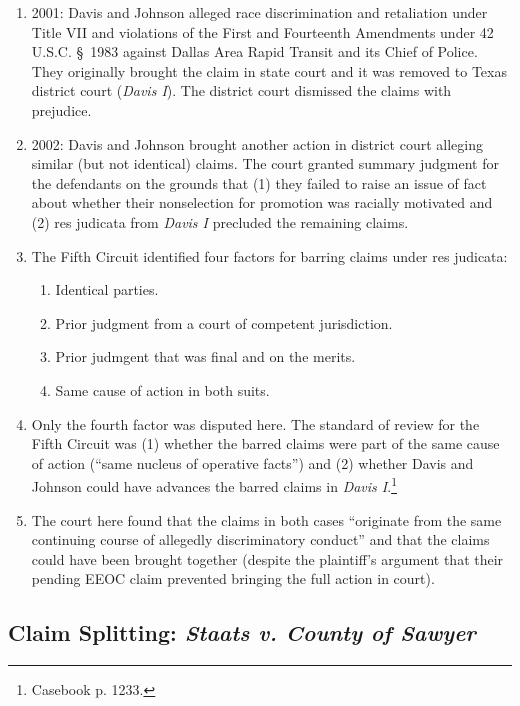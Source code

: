 \begin{enumerate}
    \item 2001: Davis and Johnson alleged race discrimination and retaliation 
    under Title VII and violations of the First and Fourteenth Amendments 
    under 42 U.S.C. \S\ 1983 against Dallas Area Rapid Transit and its Chief 
    of Police. They originally brought the claim in state court and it was 
    removed to Texas district court (\emph{Davis I}). The district court 
    dismissed the claims with prejudice.
    \item 2002: Davis and Johnson brought another action in district court 
    alleging similar (but not identical) claims. The court granted summary 
    judgment for the defendants on the grounds that (1) they failed to raise 
    an issue of fact about whether their nonselection for promotion was 
    racially motivated and (2) res judicata from \emph{Davis I} precluded the 
    remaining claims.
    \item The Fifth Circuit identified four factors for barring claims under 
    res judicata:
    \begin{enumerate}
        \item Identical parties.
        \item Prior judgment from a court of competent jurisdiction.
        \item Prior judmgent that was final and on the merits.
        \item Same cause of action in both suits.
    \end{enumerate}
    \item Only the fourth factor was disputed here. The standard of review for 
    the Fifth Circuit was (1) whether the barred claims were part of the same 
    cause of action (``same nucleus of operative facts'') and (2) whether 
    Davis and Johnson could have advances the barred claims in \emph{Davis 
    I}.\footnote{Casebook p. 1233.}
    \item The court here found that the claims in both cases ``originate from 
    the same continuing course of allegedly discriminatory conduct'' and that 
    the claims could have been brought together (despite the plaintiff's 
    argument that their pending EEOC claim prevented bringing the full action 
    in court).
\end{enumerate}

\subsection{Claim Splitting: \emph{Staats v. County of Sawyer}}

